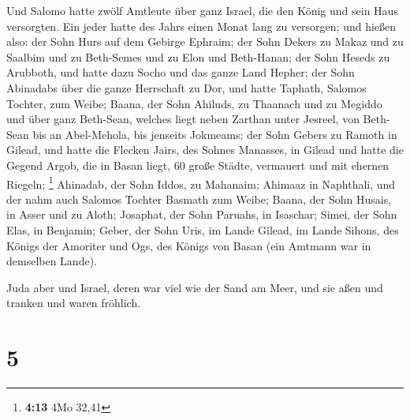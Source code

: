  Und Salomo hatte zwölf Amtleute über ganz Israel, die den
König und sein Haus versorgten. Ein jeder hatte des Jahrs einen Monat
lang zu versorgen;  und hießen also: der Sohn Hurs auf dem
Gebirge Ephraim;  der Sohn Dekers zu Makaz und zu Saalbim
und zu Beth-Semes und zu Elon und Beth-Hanan;  der Sohn
Heseds zu Arubboth, und hatte dazu Socho und das ganze Land Hepher;
 der Sohn Abinadabs über die ganze Herrschaft zu Dor, und
hatte Taphath, Salomos Tochter, zum Weibe;  Baana, der
Sohn Ahiluds, zu Thaanach und zu Megiddo und über ganz Beth-Sean,
welches liegt neben Zarthan unter Jesreel, von Beth-Sean bis an
Abel-Mehola, bis jenseits Jokmeams;  der Sohn Gebers zu
Ramoth in Gilead, und hatte die Flecken Jairs, des Sohnes Manasses, in
Gilead und hatte die Gegend Argob, die in Basan liegt, 60 große Städte,
vermauert und mit ehernen Riegeln; \footnote{\textbf{4:13} 4Mo 32,41}
 Ahinadab, der Sohn Iddos, zu Mahanaim; 
Ahimaaz in Naphthali, und der nahm auch Salomos Tochter Basmath zum
Weibe;  Baana, der Sohn Husais, in Asser und zu Aloth;
 Josaphat, der Sohn Paruahs, in Isaschar; 
Simei, der Sohn Elas, in Benjamin;  Geber, der Sohn Uris,
im Lande Gilead, im Lande Sihons, des Königs der Amoriter und Ogs, des
Königs von Basan (ein Amtmann war in demselben Lande).

 Juda aber und Israel, deren war viel wie der Sand am
Meer, und sie aßen und tranken und waren fröhlich.

\hypertarget{section-4}{%
\section{5}\label{section-4}}

